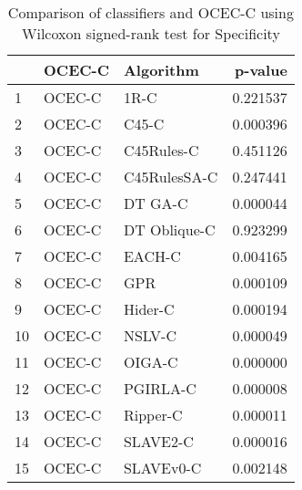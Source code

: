 \begin{table}
\footnotesize
\caption{Comparison of classifiers and OCEC-C using Wilcoxon signed-rank test for Specificity}
\label{tab:OCEC-C wilcoxon Specificity comparison}
\begin{tabular}{lllr}
\hline
 & OCEC-C & Algorithm & p-value \\
\hline
1 & OCEC-C & 1R-C & 0.221537 \\
2 & OCEC-C & C45-C & 0.000396 \\
3 & OCEC-C & C45Rules-C & 0.451126 \\
4 & OCEC-C & C45RulesSA-C & 0.247441 \\
5 & OCEC-C & DT GA-C & 0.000044 \\
6 & OCEC-C & DT Oblique-C & 0.923299 \\
7 & OCEC-C & EACH-C & 0.004165 \\
8 & OCEC-C & GPR & 0.000109 \\
9 & OCEC-C & Hider-C & 0.000194 \\
10 & OCEC-C & NSLV-C & 0.000049 \\
11 & OCEC-C & OIGA-C & 0.000000 \\
12 & OCEC-C & PGIRLA-C & 0.000008 \\
13 & OCEC-C & Ripper-C & 0.000011 \\
14 & OCEC-C & SLAVE2-C & 0.000016 \\
15 & OCEC-C & SLAVEv0-C & 0.002148 \\
\hline
\end{tabular}
\end{table}
